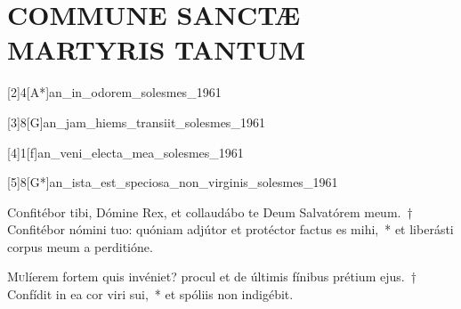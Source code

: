 \documentclass[vesperale_romanum.tex]{subfiles}
\begin{document}
\section[Commune non Virginum]{COMMUNE SANCTÆ MARTYRIS TANTUM}
\subtitle{et nec Virginis nec Martyris.}




[2]{4}[A*]{an_in_odorem_solesmes_1961}

[3]{8}[G]{an_jam_hiems_transiit_solesmes_1961}

[4]{1}[f]{an_veni_electa_mea_solesmes_1961}

[5]{8}[G*]{an_ista_est_speciosa_non_virginis_solesmes_1961}



\lettrine{C}{o}nfitébor tibi, Dómine Rex, et collaudábo te Deum Salvatórem meum.~† Confitébor nómini tuo: quóniam adjútor et proté\-ctor fa\-ctus es mihi,~* et liberásti corpus meum a perditióne.


\lettrine{M}{u}líerem fortem quis invéniet? procul et de últimis fínibus prétium ejus.~† Confídit in ea cor viri sui,~* et spóliis non indigébit.







\end{document}
